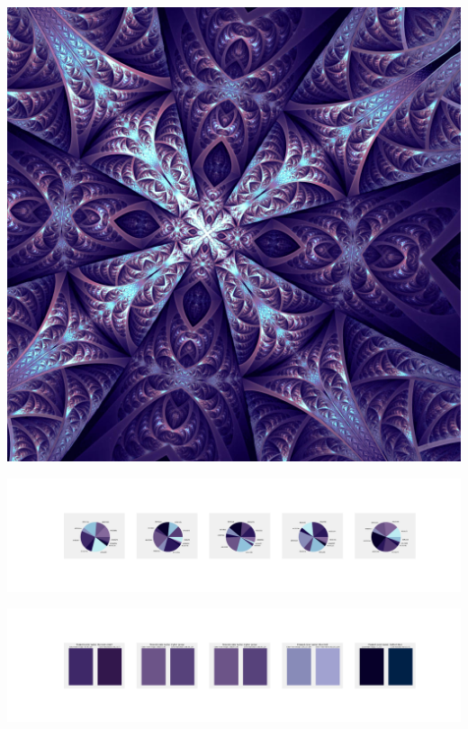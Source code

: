 \documentclass[11pt]{article}
\begin{document}
\begin{landscape}
    \begin{center}
    \includegraphics[width=\textwidth]{./nbimg/file (428).jpg}
    \end{center}

    \begin{center}
    \includegraphics[width=250mm]{./nbimg/pie-365.jpg}
    \end{center}

    \begin{center}
    \includegraphics[width=250mm]{./nbimg/peak-365.jpg}
    \end{center}
    


\end{landscape}
\end{document}
